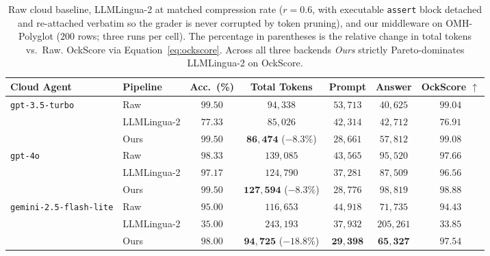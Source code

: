 \documentclass[11pt,a4paper,twocolumn]{article}
\begin{document}
\begin{table}[t]
\centering
\small
\setlength{\tabcolsep}{4pt}
\begin{tabular}{llccccc}
\toprule
\textbf{Cloud Agent} & \textbf{Pipeline} & \textbf{Acc.\ (\%)} & \textbf{Total Tokens} & \textbf{Prompt} & \textbf{Answer} & \textbf{OckScore $\uparrow$} \\
\midrule
\multirow{3}{*}{\texttt{gpt-3.5-turbo}}        & Raw         & $99.50$          & $94{,}338$                          & $53{,}713$          & $40{,}625$          & $99.04$ \\
                                               & LLMLingua-2 & $77.33$          & $85{,}026$                          & $42{,}314$          & $42{,}712$          & $76.91$ \\
                                               & Ours        & $\mathbf{99.50}$ & $\mathbf{86{,}474}$ ($-8.3\%$)      & $28{,}661$          & $57{,}812$          & $\mathbf{99.08}$ \\
\midrule
\multirow{3}{*}{\texttt{gpt-4o}}               & Raw         & $98.33$          & $139{,}085$                         & $43{,}565$          & $95{,}520$          & $97.66$ \\
                                               & LLMLingua-2 & $97.17$          & $124{,}790$                         & $37{,}281$          & $87{,}509$          & $96.56$ \\
                                               & Ours        & $\mathbf{99.50}$ & $\mathbf{127{,}594}$ ($-8.3\%$)     & $28{,}776$          & $98{,}819$          & $\mathbf{98.88}$ \\
\midrule
\multirow{3}{*}{\texttt{gemini-2.5-flash-lite}}& Raw         & $95.00$          & $116{,}653$                         & $44{,}918$          & $71{,}735$          & $94.43$ \\
                                               & LLMLingua-2 & $35.00$          & $243{,}193$                         & $37{,}932$          & $205{,}261$         & $33.85$ \\
                                               & Ours        & $\mathbf{98.00}$ & $\mathbf{94{,}725}$ ($-18.8\%$)     & $\mathbf{29{,}398}$ & $\mathbf{65{,}327}$ & $\mathbf{97.54}$ \\
\bottomrule
\end{tabular}
\caption{Raw cloud baseline, LLMLingua-2 \cite{pan2024llmlingua2} at matched compression rate ($r{=}0.6$, with executable \texttt{assert} block detached and re-attached verbatim so the grader is never corrupted by token pruning), and our middleware on OMH-Polyglot ($200$ rows; three runs per cell). The percentage in parentheses is the relative change in total tokens vs.\ Raw. OckScore via Equation~\ref{eq:ockscore}. Across all three backends \textit{Ours} strictly Pareto-dominates LLMLingua-2 on OckScore.}
\label{tab:main-results}
\end{table}
\end{document}
